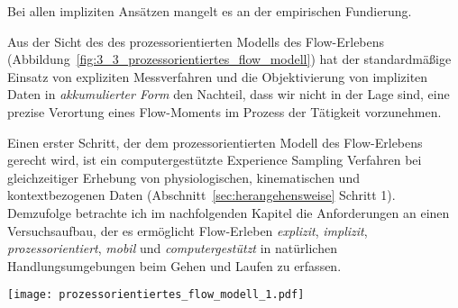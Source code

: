 Bei allen impliziten Ansätzen mangelt es an der empirischen Fundierung. 

Aus der Sicht des des prozessorientierten Modells des Flow-Erlebens (Abbildung~\ref{fig:3_3_prozessorientiertes_flow_modell}) hat der standardmäßige Einsatz von expliziten Messverfahren und die Objektivierung von impliziten Daten in \emph{akkumulierter Form} den Nachteil, dass wir nicht in der Lage sind, eine prezise Verortung eines Flow-Moments im Prozess der Tätigkeit vorzunehmen. 

Einen erster Schritt, der dem prozessorientierten Modell des Flow-Erlebens gerecht wird, ist ein computergestützte Experience Sampling Verfahren bei gleichzeitiger Erhebung von physiologischen, kinematischen und kontextbezogenen Daten (Abschnitt~\ref{sec:herangehensweise} Schritt 1). Demzufolge betrachte ich im nachfolgenden Kapitel die Anforderungen an einen Versuchsaufbau, der es ermöglicht Flow-Erleben \emph{explizit}, \emph{implizit}, \emph{prozessorientiert}, \emph{mobil} und \emph{computergestützt} in natürlichen Handlungsumgebungen beim Gehen und Laufen zu erfassen.

\begin{sidewaysfigure}
	\texttt{[image: prozessorientiertes\_flow\_modell\_1.pdf]} \caption[Prozessorientiertes Modell des Flow-Erlebens (erweitert)]{Prozessorientiertes Modell mit Annahmen zu implizit messbaren Auswirkungen des Flow-Erlebens} \label{fig:3_3_prozessorientiertes_flow_modell} 
\end{sidewaysfigure}

